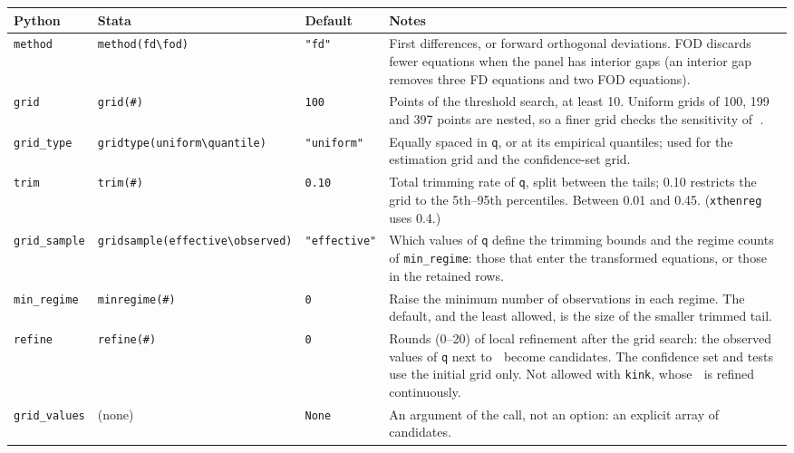\documentclass[
  10.5pt,
  a4paper,
]{article}
\newcounter{none} %
\begin{document}
{\def\LTcaptype{none} %
\begin{longtable}[]{@{}
  >{\raggedright\arraybackslash}p{}
  >{\raggedright\arraybackslash}p{}
  >{\raggedright\arraybackslash}p{}
  >{\raggedright\arraybackslash}p{}@{}}
\toprule\noalign{}
\begin{minipage}[b]{\linewidth}\raggedright
Python
\end{minipage} & \begin{minipage}[b]{\linewidth}\raggedright
Stata
\end{minipage} & \begin{minipage}[b]{\linewidth}\raggedright
Default
\end{minipage} & \begin{minipage}[b]{\linewidth}\raggedright
Notes
\end{minipage} \\
\midrule\noalign{}
\endhead
\bottomrule\noalign{}
\endlastfoot
\texttt{method} & \texttt{method(fd\textbackslash{}\textbar{}fod)} &
\texttt{"fd"} & First differences, or forward orthogonal deviations. FOD
discards fewer equations when the panel has interior gaps (an interior
gap removes three FD equations and two FOD equations). \\
\texttt{grid} & \texttt{grid(\#)} & \texttt{100} & Points of the
threshold search, at least 10. Uniform grids of 100, 199 and 397 points
are nested, so a finer grid checks the sensitivity of . \\
\texttt{grid\_type} &
\texttt{gridtype(uniform\textbackslash{}\textbar{}quantile)} &
\texttt{"uniform"} & Equally spaced in \texttt{q}, or at its empirical
quantiles; used for the estimation grid and the confidence-set grid. \\
\texttt{trim} & \texttt{trim(\#)} & \texttt{0.10} & Total trimming rate
of \texttt{q}, split between the tails; 0.10 restricts the grid to the
5th--95th percentiles. Between 0.01 and 0.45. (\texttt{xthenreg} uses
0.4.) \\
\texttt{grid\_sample} &
\texttt{gridsample(effective\textbackslash{}\textbar{}observed)} &
\texttt{"effective"} & Which values of \texttt{q} define the trimming
bounds and the regime counts of \texttt{min\_regime}: those that enter
the transformed equations, or those in the retained rows. \\
\texttt{min\_regime} & \texttt{minregime(\#)} & \texttt{0} & Raise the
minimum number of observations in each regime. The default, and the
least allowed, is the size of the smaller trimmed tail. \\
\texttt{refine} & \texttt{refine(\#)} & \texttt{0} & Rounds (0--20) of
local refinement after the grid search: the observed values of
\texttt{q} next to  become candidates. The confidence set and tests use
the initial grid only. Not allowed with \texttt{kink}, whose  is
refined continuously. \\
\texttt{grid\_values} & (none) & \texttt{None} & An argument of the
call, not an option: an explicit array of candidates. \\
\end{longtable}
}
\end{document}
